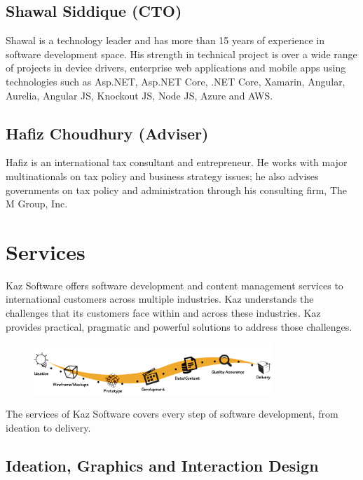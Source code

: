 \subsection[CTO]{Shawal Siddique (CTO)}

Shawal is a technology leader and has more than 15 years of experience in software development space.
His strength in technical project is over a wide range of projects in device drivers, enterprise web applications and mobile apps using technologies such as Asp.NET, Asp.NET Core, .NET Core, Xamarin, Angular, Aurelia, Angular JS, Knockout JS, Node JS, Azure and AWS.

\subsection[Adviser]{Hafiz Choudhury (Adviser)}

Hafiz is an international tax consultant and entrepreneur.
He works with major multinationals on tax policy and business strategy issues; he also advises governments on tax policy and administration through his consulting firm, The M Group, Inc.

\section{Services}

Kaz Software offers software development and content management services to international customers across multiple industries.
Kaz understands the challenges that its customers face within and across these industries.
Kaz provides practical, pragmatic and powerful solutions to address those challenges.

\begin{figure}[h]
    \begin{center}
        \includegraphics[width= 0.8\textwidth]{images/Chapter2/kaz_services.png}  
        \label{fig:kazServices}
    \end{center}
\end{figure}

The services of Kaz Software covers every step of software development, from ideation to delivery.

\subsection{Ideation, Graphics and Interaction Design}

